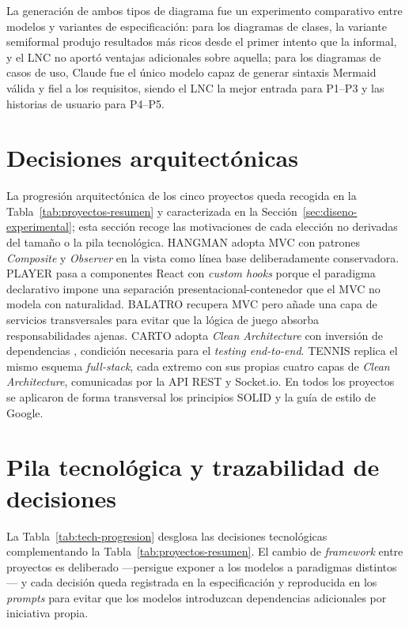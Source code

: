 La generación de ambos tipos de diagrama fue un experimento comparativo entre modelos y variantes de especificación: para los diagramas de clases, la variante semiformal produjo resultados más ricos desde el primer intento que la informal, y el \ac{LNC} no aportó ventajas adicionales sobre aquella; para los diagramas de casos de uso, Claude fue el único modelo capaz de generar sintaxis Mermaid válida y fiel a los requisitos, siendo el \ac{LNC} la mejor entrada para P1--P3 y las historias de usuario para P4--P5.

\section{Decisiones arquitectónicas} \label{sec:arch-decisions}

La progresión arquitectónica de los cinco proyectos queda recogida en la Tabla~\ref{tab:proyectos-resumen} y caracterizada en la Sección~\ref{sec:diseno-experimental}; esta sección recoge las motivaciones de cada elección no derivadas del tamaño o la pila tecnológica. \ac{HANGMAN} adopta \ac{MVC} \cite{Reenskaug:1979:MVC} con patrones \textit{Composite} y \textit{Observer} \cite{Gamma:1994:Design} en la vista como línea base deliberadamente conservadora. \ac{PLAYER} pasa a componentes React con \textit{custom hooks} porque el paradigma declarativo impone una separación presentacional-contenedor que el \ac{MVC} no modela con naturalidad. \ac{BALATRO} recupera \ac{MVC} pero añade una capa de servicios transversales para evitar que la lógica de juego absorba responsabilidades ajenas. \ac{CARTO} adopta \textit{Clean Architecture} \cite{Martin:2018:CleanArchitecture} con inversión de dependencias \cite{Martin:2003:Agile}, condición necesaria para el \textit{testing end-to-end}. \ac{TENNIS} replica el mismo esquema \textit{full-stack}, cada extremo con sus propias cuatro capas de \textit{Clean Architecture}, comunicadas por la \ac{API} REST y Socket.io. En todos los proyectos se aplicaron de forma transversal los principios \ac{SOLID} \cite{Martin:2003:Agile} y la guía de estilo de Google.

\section{Pila tecnológica y trazabilidad de decisiones} \label{sec:tech-stack}

La Tabla~\ref{tab:tech-progresion} desglosa las decisiones tecnológicas complementando la Tabla~\ref{tab:proyectos-resumen}. El cambio de \textit{framework} entre proyectos es deliberado —persigue exponer a los modelos a paradigmas distintos— y cada decisión queda registrada en la especificación y reproducida en los \textit{prompts} para evitar que los modelos introduzcan dependencias adicionales por iniciativa propia.

